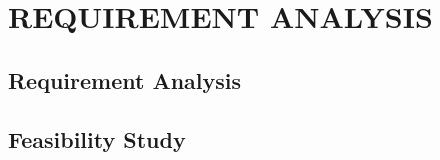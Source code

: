 \documentclass[main]{subfiles}
\begin{document}
\chapter{\MakeUppercase{REQUIREMENT ANALYSIS}}

\section{Requirement Analysis}
\section{Feasibility Study}
\end{document}
